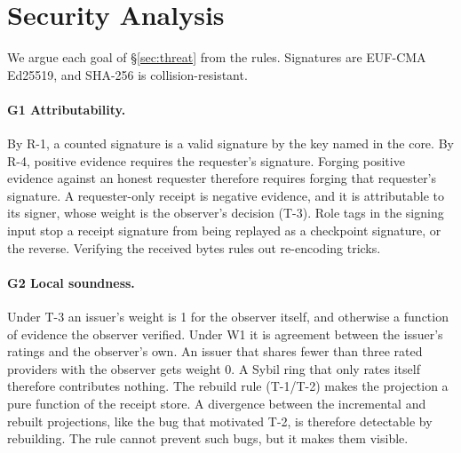 \section{Security Analysis}
\label{sec:security}

We argue each goal of \S\ref{sec:threat} from the rules. Signatures are
EUF-CMA Ed25519, and SHA-256 is collision-resistant.

\paragraph{G1 Attributability.}
By R-1, a counted signature is a valid signature by the key named in the
core. By R-4, positive evidence requires the requester's signature.
Forging positive evidence against an honest requester therefore requires
forging that requester's signature. A requester-only receipt is negative
evidence, and it is attributable to its signer, whose weight is the
observer's decision (T-3). Role tags in the signing input stop a receipt
signature from being replayed as a checkpoint signature, or the reverse.
Verifying the received bytes rules out re-encoding tricks.

\paragraph{G2 Local soundness.}
Under T-3 an issuer's weight is 1 for the observer itself, and otherwise
a function of evidence the observer verified. Under W1 it is agreement
between the issuer's ratings and the observer's own. An issuer that
shares fewer than three rated providers with the observer gets weight 0.
A Sybil ring that only rates itself therefore contributes nothing. The
rebuild rule (T-1/T-2) makes the projection a pure function of the
receipt store. A divergence between the incremental and rebuilt
projections, like the bug that motivated T-2, is therefore detectable by
rebuilding. The rule cannot prevent such bugs, but it makes them visible.

